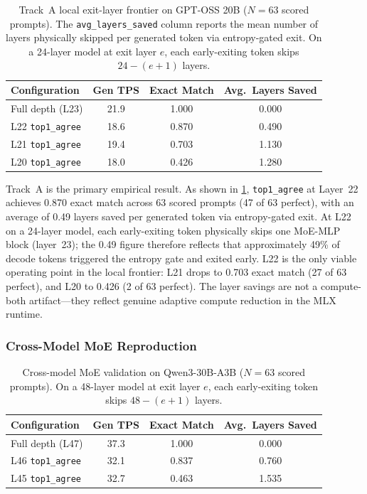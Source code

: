 \documentclass[11pt]{article}
\begin{document}
\begin{table}[t]
\centering
\small
\caption{Track~A local exit-layer frontier on GPT-OSS 20B ($N{=}63$ scored prompts). The \texttt{avg\_layers\_saved} column reports the mean number of layers physically skipped per generated token via entropy-gated exit. On a 24-layer model at exit layer $e$, each early-exiting token skips $24 - (e{+}1)$ layers.}
\label{tab:tracka}
\begin{tabular}{@{}lccc@{}}
\toprule
Configuration & Gen TPS & Exact Match & Avg.\ Layers Saved \\
\midrule
Full depth (L23) & 21.9 & 1.000 & 0.000 \\
L22 \texttt{top1\_agree} & 18.6 & 0.870 & 0.490 \\
L21 \texttt{top1\_agree} & 19.4 & 0.703 & 1.130 \\
L20 \texttt{top1\_agree} & 18.0 & 0.426 & 1.280 \\
\bottomrule
\end{tabular}
\end{table}

Track~A is the primary empirical result. As shown in \cref{tab:tracka}, \texttt{top1\_agree} at Layer~22 achieves 0.870 exact match across 63 scored prompts (47 of 63 perfect), with an average of 0.49 layers saved per generated token via entropy-gated exit. At L22 on a 24-layer model, each early-exiting token physically skips one MoE-MLP block (layer~23); the 0.49 figure therefore reflects that approximately 49\% of decode tokens triggered the entropy gate and exited early. L22 is the only viable operating point in the local frontier: L21 drops to 0.703 exact match (27 of 63 perfect), and L20 to 0.426 (2 of 63 perfect). The layer savings are not a compute-both artifact---they reflect genuine adaptive compute reduction in the MLX runtime.

\subsubsection{Cross-Model MoE Reproduction}

\begin{table}[t]
\centering
\small
\caption{Cross-model MoE validation on Qwen3-30B-A3B ($N{=}63$ scored prompts). On a 48-layer model at exit layer $e$, each early-exiting token skips $48 - (e{+}1)$ layers.}
\label{tab:tracka_qwen3}
\begin{tabular}{@{}lccc@{}}
\toprule
Configuration & Gen TPS & Exact Match & Avg.\ Layers Saved \\
\midrule
Full depth (L47) & 37.3 & 1.000 & 0.000 \\
L46 \texttt{top1\_agree} & 32.1 & 0.837 & 0.760 \\
L45 \texttt{top1\_agree} & 32.7 & 0.463 & 1.535 \\
\bottomrule
\end{tabular}
\end{table}
\end{document}
